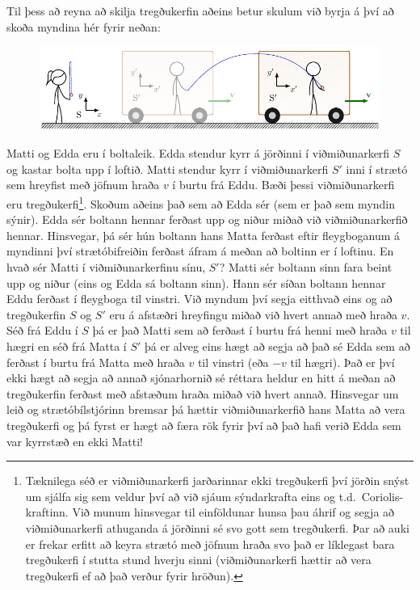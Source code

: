 Til þess að reyna að skilja tregðukerfin aðeins betur skulum við byrja á því að skoða myndina hér fyrir neðan:

\begin{figure}[H]
    \centering
    \includegraphics[width=.85\textwidth]{figures/tregdukerfi.pdf}
\end{figure}

Matti og Edda eru í boltaleik. Edda stendur kyrr á jörðinni í viðmiðunarkerfi $S$ og kastar bolta upp í loftið. Matti stendur kyrr í viðmiðunarkerfi $S'$ inni í strætó sem hreyfist með jöfnum hraða $v$ í burtu frá Eddu. Bæði þessi viðmiðunarkerfi eru tregðukerfi\footnote{Tæknilega séð er viðmiðunarkerfi jarðarinnar ekki tregðukerfi því jörðin snýst um sjálfa sig sem veldur því að við sjáum sýndarkrafta eins og t.d.~Coriolis-kraftinn. Við munum hinsvegar til einföldunar hunsa þau áhrif og segja að viðmiðunarkerfi athuganda á jörðinni sé svo gott sem tregðukerfi. Þar að auki er frekar erfitt að keyra strætó með jöfnum hraða svo það er líklegast bara tregðukerfi í stutta stund hverju sinni (viðmiðunarkerfi hættir að vera tregðukerfi ef að það verður fyrir hröðun).}. Skoðum aðeins það sem að Edda sér (sem er það sem myndin sýnir). Edda sér boltann hennar ferðast upp og niður miðað við viðmiðunarkerfið hennar. Hinsvegar, þá sér hún boltann hans Matta ferðast eftir fleygboganum á myndinni því strætóbifreiðin ferðast áfram á meðan að boltinn er í loftinu. En hvað sér Matti í viðmiðunarkerfinu sínu, $S'$? Matti sér boltann sinn fara beint upp og niður (eins og Edda sá boltann sinn). Hann sér síðan boltann hennar Eddu ferðast í fleygboga til vinstri. Við myndum því segja eitthvað eins og að tregðukerfin $S$ og $S'$ eru á afstæðri hreyfingu miðað við hvert annað með hraða $v$. Séð frá Eddu í $S$ þá er það Matti sem að ferðast í burtu frá henni með hraða $v$ til hægri en séð frá Matta í $S'$ þá er alveg eins hægt að segja að það sé Edda sem að ferðast í burtu frá Matta með hraða $v$ til vinstri (eða $-v$ til hægri). Það er því ekki hægt að segja að annað sjónarhornið sé réttara heldur en hitt á meðan að tregðukerfin ferðast með afstæðum hraða miðað við hvert annað. Hinsvegar um leið og strætóbílstjórinn bremsar þá hættir viðmiðunarkerfið hans Matta að vera tregðukerfi og þá fyrst er hægt að færa rök fyrir því að það hafi verið Edda sem var kyrrstæð en ekki Matti! \\

